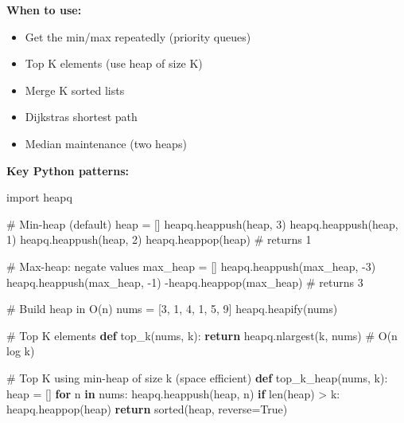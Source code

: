 \documentclass[11pt]{article}
\providecommand{\tightlist}{\setlength{\itemsep}{1pt}\setlength{\parskip}{0pt}}
\newenvironment{Shaded}{\begin{snugshade}}{\end{snugshade}}
\newcommand{\BuiltInTok}[1]{\textcolor[rgb]{0.50,0.55,0.55}{#1}}
\newcommand{\CommentTok}[1]{\textcolor[rgb]{0.48,0.49,0.49}{#1}}
\newcommand{\ControlFlowTok}[1]{\textcolor[rgb]{0.99,0.74,0.29}{\textbf{#1}}}
\newcommand{\DecValTok}[1]{\textcolor[rgb]{0.96,0.45,0.00}{#1}}
\newcommand{\ImportTok}[1]{\textcolor[rgb]{0.15,0.68,0.38}{#1}}
\newcommand{\KeywordTok}[1]{\textcolor[rgb]{0.81,0.81,0.76}{\textbf{#1}}}
\newcommand{\NormalTok}[1]{\textcolor[rgb]{0.81,0.81,0.76}{#1}}
\newcommand{\OperatorTok}[1]{\textcolor[rgb]{0.81,0.81,0.76}{#1}}
\newcommand{\VariableTok}[1]{\textcolor[rgb]{0.15,0.68,0.68}{#1}}
\begin{document}
\textbf{When to use:}

\begin{itemize}
\tightlist
\item
  Get the min/max repeatedly (priority queues)
\item
  Top K elements (use heap of size K)
\item
  Merge K sorted lists
\item
  Dijkstra\textquotesingle s shortest path
\item
  Median maintenance (two heaps)
\end{itemize}

\textbf{Key Python patterns:}


\begin{Shaded}
\begin{Highlighting}[]
\ImportTok{import}\NormalTok{ heapq}

\CommentTok{\# Min{-}heap (default)}
\NormalTok{heap }\OperatorTok{=}\NormalTok{ []}
\NormalTok{heapq.heappush(heap, }\DecValTok{3}\NormalTok{)}
\NormalTok{heapq.heappush(heap, }\DecValTok{1}\NormalTok{)}
\NormalTok{heapq.heappush(heap, }\DecValTok{2}\NormalTok{)}
\NormalTok{heapq.heappop(heap)    }\CommentTok{\# returns 1}

\CommentTok{\# Max{-}heap: negate values}
\NormalTok{max\_heap }\OperatorTok{=}\NormalTok{ []}
\NormalTok{heapq.heappush(max\_heap, }\OperatorTok{{-}}\DecValTok{3}\NormalTok{)}
\NormalTok{heapq.heappush(max\_heap, }\OperatorTok{{-}}\DecValTok{1}\NormalTok{)}
\OperatorTok{{-}}\NormalTok{heapq.heappop(max\_heap)   }\CommentTok{\# returns 3}

\CommentTok{\# Build heap in O(n)}
\NormalTok{nums }\OperatorTok{=}\NormalTok{ [}\DecValTok{3}\NormalTok{, }\DecValTok{1}\NormalTok{, }\DecValTok{4}\NormalTok{, }\DecValTok{1}\NormalTok{, }\DecValTok{5}\NormalTok{, }\DecValTok{9}\NormalTok{]}
\NormalTok{heapq.heapify(nums)}

\CommentTok{\# Top K elements}
\KeywordTok{def}\NormalTok{ top\_k(nums, k):}
    \ControlFlowTok{return}\NormalTok{ heapq.nlargest(k, nums)   }\CommentTok{\# O(n log k)}

\CommentTok{\# Top K using min{-}heap of size k (space efficient)}
\KeywordTok{def}\NormalTok{ top\_k\_heap(nums, k):}
\NormalTok{    heap }\OperatorTok{=}\NormalTok{ []}
    \ControlFlowTok{for}\NormalTok{ n }\KeywordTok{in}\NormalTok{ nums:}
\NormalTok{        heapq.heappush(heap, n)}
        \ControlFlowTok{if} \BuiltInTok{len}\NormalTok{(heap) }\OperatorTok{\textgreater{}}\NormalTok{ k:}
\NormalTok{            heapq.heappop(heap)}
    \ControlFlowTok{return} \BuiltInTok{sorted}\NormalTok{(heap, reverse}\OperatorTok{=}\VariableTok{True}\NormalTok{)}


\end{Highlighting}
\end{Shaded}
\end{document}
